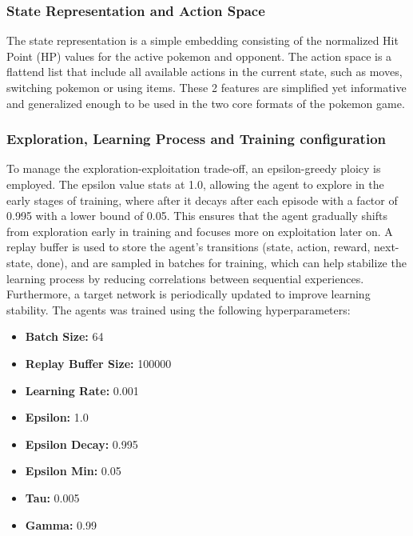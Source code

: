 \subsubsection{State Representation and Action Space}
The state representation is a simple embedding consisting of the normalized Hit Point (HP) values
for the active pokemon and opponent. The action space is a flattend list that
include all available actions in the current state, such as moves, switching pokemon
or using items. These 2 features are simplified yet informative and generalized 
enough to be used in the two core formats of the pokemon game.

\subsubsection{Exploration, Learning Process and Training configuration}
To manage the exploration-exploitation trade-off, an epsilon-greedy ploicy is employed.
The epsilon value stats at 1.0, allowing the agent to explore in the early stages of training,
where after it decays after each episode with a factor of 0.995 with a lower bound of 0.05.
This ensures that the agent gradually shifts from exploration early in training
and focuses more on exploitation later on.
A replay buffer is used to store the agent's transitions (state, action, reward, next-state, done), 
and are sampled in batches for training, which can help stabilize the learning process 
by reducing correlations between sequential experiences. Furthermore, a target 
network is periodically updated to improve learning stability.
The agents was trained using the following hyperparameters:
\begin{itemize}
    \item \textbf{Batch Size:} 64
    \item \textbf{Replay Buffer Size:} 100000
    \item \textbf{Learning Rate:} 0.001 
    \item \textbf{Epsilon:} 1.0
    \item \textbf{Epsilon Decay:} 0.995
    \item \textbf{Epsilon Min:} 0.05
    \item \textbf{Tau:} 0.005
    \item \textbf{Gamma:} 0.99
\end{itemize}

